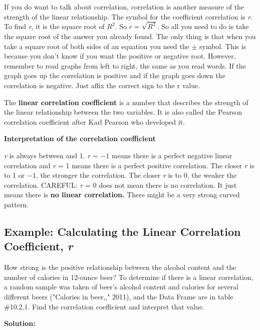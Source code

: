 \documentclass[
]{book}
\begin{document}
If you do want to talk about correlation, correlation is another measure of the strength of the linear relationship. The symbol for the coefficient correlation is \emph{r}. To find \emph{r}, it is the square root of \(R^2\). So \(r=\sqrt{R^2}\). So all you need to do is take the square root of the answer you already found. The only thing is that when you take a square root of both sides of an equation you need the \(\pm\) symbol. This is because you don't know if you want the positive or negative root. However, remember to read graphs from left to right, the same as you read words. If the graph goes up the correlation is positive and if the graph goes down the correlation is negative. Just affix the correct sign to the r value.

The \textbf{linear correlation coefficient} is a number that describes the strength of the linear relationship between the two variables. It is also called the Pearson correlation coefficient after Karl Pearson who developed it.

\textbf{Interpretation of the correlation coefficient}

\emph{r} is always between and 1. \emph{r} = \(-1\) means there is a perfect negative linear correlation and \emph{r} = 1 means there is a perfect positive correlation. The closer \emph{r} is to 1 or \(-1\), the stronger the correlation. The closer \emph{r} is to 0, the weaker the correlation. CAREFUL: \emph{r} = 0 does not mean there is no correlation. It just means there is \textbf{no linear correlation.} There might be a very strong curved pattern.

\hypertarget{example-calculating-the-linear-correlation-coefficient-r}{%
\subsection{\texorpdfstring{Example: Calculating the Linear Correlation Coefficient, \emph{r}}{Example: Calculating the Linear Correlation Coefficient, r}}\label{example-calculating-the-linear-correlation-coefficient-r}}

How strong is the positive relationship between the alcohol content and the number of calories in 12-ounce beer? To determine if there is a linear correlation, a random sample was taken of beer's alcohol content and calories for several different beers ("Calories in beer,," 2011), and the Data Frame are in table \#10.2.1. Find the correlation coefficient and interpret that value.

\textbf{Solution:}
\end{document}
